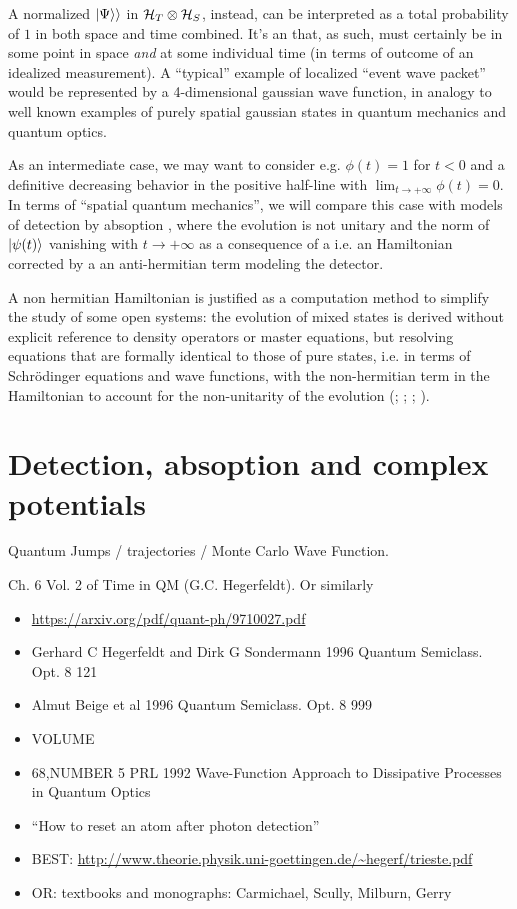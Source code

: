 A normalized $|\Psi\rangle\rangle$ in $\mathcal{H}_T \otimes \mathcal{H}_S$,
instead,
can be interpreted as a total probability of $1$ in both space and time combined.
It's an  that, as such, must certainly be in some point in space
\emph{and} at some individual time (in terms of outcome of an idealized measurement).
A ``typical'' example of localized ``event wave packet'' would be
represented by
a 4-dimensional gaussian wave function,
in analogy to well known examples of purely spatial gaussian states
in quantum mechanics and quantum optics.

As an intermediate case, we may want to consider e.g.
$\phi(t) = 1$ for $t < 0 $ and a definitive decreasing behavior
in the positive half-line with $\lim_{t \to +\infty} \phi(t) = 0$.
In terms of ``spatial quantum mechanics'', we will compare this case with
models of detection by absoption \parencite{RuschhauptAbsorption},
where the evolution is not unitary and
the norm of $\ket{\psi(t)}$ vanishing with $t \to +\infty$
as a consequence of a 
i.e.
an Hamiltonian corrected by a an anti-hermitian term
modeling the detector.

A non hermitian Hamiltonian is justified as a computation method
to simplify the study of some open systems: the evolution of mixed
states is derived without explicit reference to density operators
or master equations, but resolving equations that are formally
identical to those of pure states,
i.e. in terms of
Schr{\"o}dinger equations and wave functions,
with the non-hermitian term in the Hamiltonian
to account for the non-unitarity of the evolution
(\cite[Ch. 6]{TQM2}; \cite{Wave-function_approach}; \cite{HowToResetAnAtom}; \cite{TheQuantumJumpApproach}).

\section{Detection, absoption and complex potentials}

Quantum Jumps / trajectories / Monte Carlo Wave Function.

Ch. 6 Vol. 2 of Time in QM (G.C. Hegerfeldt). Or similarly
\begin{itemize}
  \item \url{https://arxiv.org/pdf/quant-ph/9710027.pdf}
  \item Gerhard C Hegerfeldt and Dirk G Sondermann 1996 Quantum Semiclass. Opt. 8 121
  \item  Almut Beige et al 1996 Quantum Semiclass. Opt. 8 999
  \item VOLUME
  \item 68,NUMBER 5 PRL 1992 Wave-Function Approach to Dissipative Processes in Quantum Optics
  \item ``How to reset an atom after photon detection'' 
  \item BEST: \url{http://www.theorie.physik.uni-goettingen.de/~hegerf/trieste.pdf}
  \item OR: textbooks and monographs: Carmichael, Scully, Milburn, Gerry
\end{itemize}


